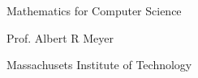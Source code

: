 \begin{center}
\begin{minipage}{4.5in}
\begin{center}
\rule{0in}{2in}
{\huge Mathematics for Computer Science}


\vspace{0.5in}

\Stamp

\vspace{1in}
{\LARGE Prof. Albert R Meyer}

{\large Massachusets Institute of Technology}

\end{center}

\end{minipage}
\end{center}
\coursecopyright

\tableofcontents

\endinput
